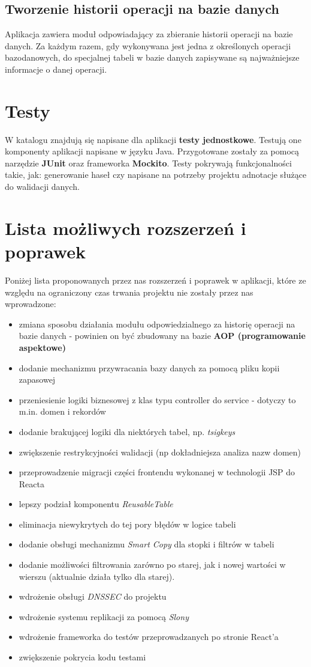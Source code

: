 \documentclass[11pt]{article}
\begin{document}
\subsection{Tworzenie historii operacji na bazie danych}
Aplikacja zawiera moduł odpowiadający za zbieranie historii operacji na bazie danych. Za każdym razem, gdy wykonywana jest jedna z określonych operacji bazodanowych, do specjalnej tabeli w bazie danych zapisywane są najważniejsze informacje o danej operacji.




\section{Testy}
W katalogu  znajdują się napisane dla aplikacji \textbf{testy jednostkowe}. Testują one komponenty aplikacji napisane w języku Java. Przygotowane zostały za pomocą narzędzie \textbf{JUnit} oraz frameworka \textbf{Mockito}. Testy pokrywają funkcjonalności takie, jak: generowanie haseł czy napisane na potrzeby projektu adnotacje służące do walidacji danych.




\section{Lista możliwych rozszerzeń i poprawek}
Poniżej lista proponowanych przez nas rozszerzeń i poprawek w aplikacji, które ze względu na ograniczony czas trwania projektu nie zostały przez nas wprowadzone:
\begin{itemize}
\item zmiana sposobu działania modułu odpowiedzialnego za historię operacji na bazie danych - powinien on być zbudowany na bazie \textbf{AOP (programowanie aspektowe)}
\item dodanie mechanizmu przywracania bazy danych za pomocą pliku kopii zapasowej
\item przeniesienie logiki biznesowej z klas typu controller do service - dotyczy to m.in. domen i rekordów
\item dodanie brakującej logiki dla niektórych tabel, np. \emph{tsigkeys}
\item zwiększenie restrykcyjności walidacji (np dokładniejsza analiza nazw domen)
\item przeprowadzenie migracji części frontendu wykonanej w technologii JSP do Reacta
\item lepszy podział komponentu \emph{ReusableTable}
\item eliminacja niewykrytych do tej pory błędów w logice tabeli
\item dodanie obsługi mechanizmu \emph{Smart Copy} dla stopki i filtrów w tabeli
\item dodanie możliwości filtrowania zarówno po starej, jak i nowej wartości w wierszu (aktualnie działa tylko dla starej). 
\item wdrożenie obsługi \emph{DNSSEC} do projektu
\item wdrożenie systemu replikacji za pomocą \emph{Slony}
\item wdrożenie frameworka do testów przeprowadzanych po stronie React'a
\item zwiększenie pokrycia kodu testami
\end{itemize}
\end{document}
